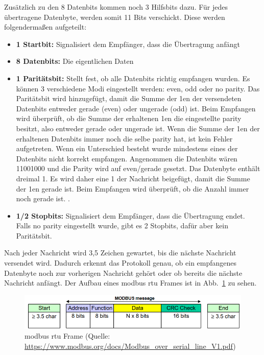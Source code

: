 Zusätzlich zu den 8 Datenbits kommen noch 3 Hilfsbits dazu. Für jedes übertragene Datenbyte, werden somit 11 Bits verschickt. Diese werden folgendermaßen aufgeteilt:
\begin{itemize}
	\item \textbf{1 Startbit:} Signalisiert dem Empfänger, dass die Übertragung anfängt
	\item \textbf{8 Datenbits:} Die eigentlichen Daten	
	\item \textbf{1 Paritätsbit:} Stellt fest, ob alle Datenbits richtig empfangen wurden. Es können 3 verschiedene Modi eingestellt werden: even, odd oder no parity. Das Paritätsbit wird hinzugefügt, damit die Summe der 1en der versendeten Datenbits entweder gerade (even) oder ungerade (odd) ist. Beim Empfangen wird überprüft, ob die Summe der erhaltenen 1en die eingestellte \gls{parity} besitzt, also entweder gerade oder ungerade ist. Wenn die Summe der 1en der erhaltenen Datenbits immer noch die selbe \gls{parity} hat, ist kein Fehler aufgetreten. Wenn ein Unterschied besteht wurde mindestens eines der Datenbits nicht korrekt empfangen. Angenommen die Datenbits wären 11001000 und die Parity wird auf even/gerade gesetzt. Das Datenbyte enthält  dreimal 1. Es wird daher eine 1 der Nachricht beigefügt, damit die Summe der 1en gerade ist. Beim Empfangen wird überprüft, ob die Anzahl immer noch gerade ist. \cite{IBM_Corporation:2023}.	 
	\item \textbf{1/2 Stopbits:} Signalisiert dem Empfänger, dass die Übertragung endet. Falls no parity eingestellt wurde, gibt es 2 Stopbits, dafür aber kein Paritätsbit.
\end{itemize}

Nach jeder Nachricht wird 3,5 Zeichen gewartet, bis die nächste Nachricht versendet wird. Dadurch erkennt das Protokoll genau, ob ein empfangenes Datenbyte noch zur vorherigen Nachricht gehört oder ob bereits die nächste Nachricht anfängt.
Der Aufbau eines \gls{modbus} \acs{rtu} Frames ist in Abb.~\ref{fig:modbus_frame} zu sehen.
\begin{figure}[H]
	\centering
	\includegraphics[width=1.0\linewidth]{Bilder/Modbus_frame}
	\caption{\gls{modbus} \acs{rtu} Frame (Quelle: \url{https://www.modbus.org/docs/Modbus_over_serial_line_V1.pdf})}
	\label{fig:modbus_frame}
\end{figure}

